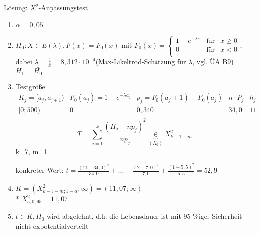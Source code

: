 \documentclass[a4paper]{scrartcl}
\begin{document}
Lösung: $X^2$-Anpassungstest 
\begin{enumerate}
\item $\alpha = 0,05$
\item $H_0 : X \in E(\lambda), F(x) = F_0(x)$
mit $F_0(x) = \left \{ \begin{array}{lcr} 1-e^{-\lambda x} & \text{für} & x \geq 0\\ 0 & \text{für} & x <0 \\ \end{array} \right.$, dabei $\lambda = \frac{1}{\bar{x}} =  8,312 \cdot 10^{-4}$(Max-Likeltrod-Schätzung für $\lambda$, vgl. ÜA B9) $H_1= \bar{H_0}$
\item Testgröße
$\begin{array}{l|c|c|c|r}
K_j = [ a_j, a_{j+1} ) & F_0(a_j) = 1-e^{-\lambda a_j} & p_j = F_0 (a_j + 1) -F_0(a_j) & n \cdot P_j & h_j \\ \hline
[0;500)     & 0     & 0,340 & 34,0 & 11\\
\end{array}$\\
\[ T = \sum\limits_{j=1}^k \frac{(H_j - n p_j)^2}{np_j} \underbrace{\tilde{\in}}_{(H_0)} X^2_{k-1-m}\] k=7, m=1

konkreter Wert: $t= \frac{(11-34,0)^2}{34,0} + \dots + \frac{(2-7,0)^2}{7,0} + \frac{(1-5,5)^2}{5,5} = 52,9$
\item $K = (X^2_{k-1-m;1-\alpha};\infty) = (11,07;\infty)$\\*
$X^2_{5;0,95} = 11,07$
\item $t \in K, H_0$ wird abgelehnt, d.h. die Lebensdauer ist mit 95 \%iger Sicherheit nicht expotentialverteilt

\end{enumerate}
\end{document}

